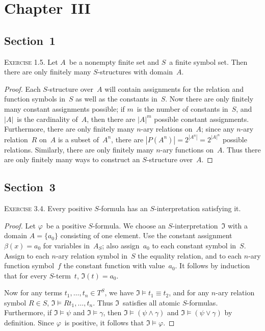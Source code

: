 \documentclass[letterpaper]{article}
\theoremstyle{remark}
\begin{document}
\section*{Chapter~III}

\subsection*{Section~1}
\noindent\textsc{Exercise 1.5.}
Let $A$~be a nonempty finite set and $S$~a finite symbol set. Then there are only finitely many $S$-structures with domain~$A$.
\begin{proof}
Each $S$-structure over~$A$ will contain assignments for the relation and function symbols in~$S$ as well as the constants in~$S$. Now there are only finitely many constant assignments possible; if $m$~is the number of constants in~$S$, and $|A|$~is the cardinality of~$A$, then there are $|A|^m$ possible constant assignments. Furthermore, there are only finitely many $n$-ary relations on~$A$; since any $n$-ary relation~$R$ on~$A$ is a subset of~$A^n$, there are $|P(A^n)|=2^{|A^n|}=2^{|A|^n}$ possible relations. Similarly, there are only finitely many $n$-ary functions on~$A$. Thus there are only finitely many ways to construct an $S$-structure over~$A$.
\end{proof}

\subsection*{Section~3}
\noindent\textsc{Exercise 3.4.}
Every positive $S$-formula has an $S$-interpretation satisfying it.
\begin{proof}
Let $\varphi$~be a positive $S$-formula. We choose an $S$-interpretation~$\mathfrak{I}$ with a domain $A=\{a_0\}$ consisting of one element. Use the constant assignment $\beta(x)=a_0$ for variables in~$A_S$; also assign~$a_0$ to each constant symbol in~$S$. Assign to each $n$-ary relation symbol in~$S$ the equality relation, and to each $n$-ary function symbol~$f$ the constant function with value~$a_0$. It follows by induction that for every $S$-term~$t$, $\mathfrak{I}(t)=a_0$.

Now for any terms $t_1,\ldots,t_n\in T^S$, we have $\mathfrak{I}\models t_1\equiv t_2$, and for any $n$-ary relation symbol $R\in S$, $\mathfrak{I}\models Rt_1,\ldots,t_n$. Thus $\mathfrak{I}$~satisfies all atomic $S$-formulas. Furthermore, if $\mathfrak{I}\models\psi$ and $\mathfrak{I}\models\gamma$, then $\mathfrak{I}\models(\psi\land\gamma)$ and $\mathfrak{I}\models(\psi\lor\gamma)$ by definition. Since $\varphi$~is positive, it follows that $\mathfrak{I}\models\varphi$.
\end{proof}
\end{document}
